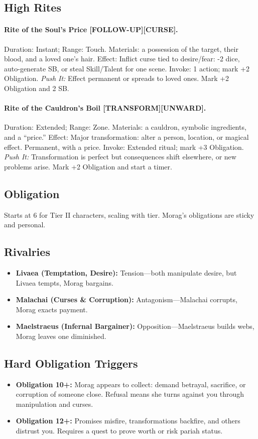 \documentclass[11pt]{article}
\begin{document}
\subsection*{High Rites}
\paragraph{Rite of the Soul's Price [FOLLOW-UP][CURSE].} Duration: Instant; Range: Touch.  
Materials: a possession of the target, their blood, and a loved one's hair.  
Effect: Inflict curse tied to desire/fear: -2 dice, auto-generate SB, or steal Skill/Talent for one scene.  
Invoke: 1 action; mark +2 Obligation.  
\emph{Push It:} Effect permanent or spreads to loved ones. Mark +2 Obligation and 2 SB.  

\paragraph{Rite of the Cauldron's Boil [TRANSFORM][UNWARD].} Duration: Extended; Range: Zone.  
Materials: a cauldron, symbolic ingredients, and a ``price.''  
Effect: Major transformation: alter a person, location, or magical effect. Permanent, with a price.  
Invoke: Extended ritual; mark +3 Obligation.  
\emph{Push It:} Transformation is perfect but consequences shift elsewhere, or new problems arise. Mark +2 Obligation and start a timer.

\subsection*{Obligation}
Starts at 6 for Tier II characters, scaling with tier. Morag's obligations are sticky and personal.

\subsection*{Rivalries}
\begin{itemize}
  \item \textbf{Livaea (Temptation, Desire):} Tension---both manipulate desire, but Livaea tempts, Morag bargains.  
  \item \textbf{Malachai (Curses \& Corruption):} Antagonism---Malachai corrupts, Morag exacts payment.  
  \item \textbf{Maelstraeus (Infernal Bargainer):} Opposition---Maelstraeus builds webs, Morag leaves one diminished.  
\end{itemize}

\subsection*{Hard Obligation Triggers}
\begin{itemize}
  \item \textbf{Obligation 10+:} Morag appears to collect: demand betrayal, sacrifice, or corruption of someone close. Refusal means she turns against you through manipulation and curses.  
  \item \textbf{Obligation 12+:} Promises misfire, transformations backfire, and others distrust you. Requires a quest to prove worth or risk pariah status.  
\end{itemize}
\end{document}
